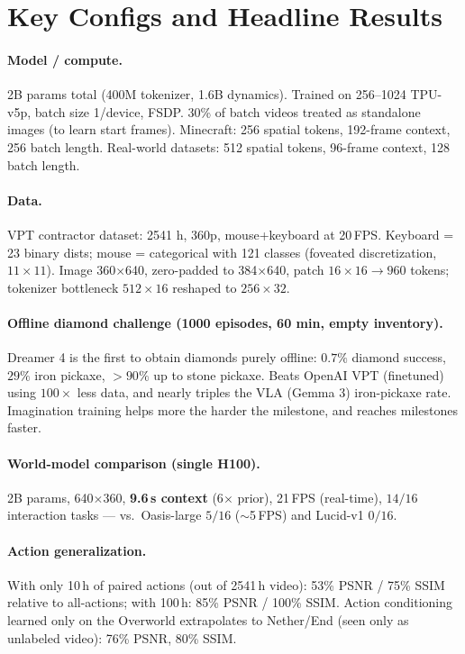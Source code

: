 \documentclass[11pt]{article}
\begin{document}
\section{Key Configs and Headline Results}

\paragraph{Model / compute.}
2B params total (400M tokenizer, 1.6B dynamics). Trained on 256--1024 TPU-v5p, batch
size 1/device, FSDP. 30\% of batch videos treated as standalone images (to learn start
frames). Minecraft: 256 spatial tokens, 192-frame context, 256 batch length. Real-world
datasets: 512 spatial tokens, 96-frame context, 128 batch length.

\paragraph{Data.}
VPT contractor dataset: 2541 h, 360p, mouse+keyboard at 20\,FPS. Keyboard = 23 binary
dists; mouse = categorical with 121 classes (foveated discretization, $11\times11$).
Image 360$\times$640, zero-padded to 384$\times$640, patch $16\times16 \to 960$ tokens;
tokenizer bottleneck $512\times16$ reshaped to $256\times32$.

\paragraph{Offline diamond challenge (1000 episodes, 60 min, empty inventory).}
Dreamer 4 is the first to obtain diamonds purely offline: $0.7\%$ diamond success,
$29\%$ iron pickaxe, $>90\%$ up to stone pickaxe. Beats OpenAI VPT (finetuned) using
$100\times$ less data, and nearly triples the VLA (Gemma 3) iron-pickaxe rate.
Imagination training helps more the harder the milestone, and reaches milestones faster.

\paragraph{World-model comparison (single H100).}
2B params, 640$\times$360, \textbf{9.6\,s context} (6$\times$ prior), 21\,FPS (real-time),
$14/16$ interaction tasks --- vs.\ Oasis-large $5/16$ ($\sim$5\,FPS) and Lucid-v1 $0/16$.

\paragraph{Action generalization.}
With only 10\,h of paired actions (out of 2541\,h video): 53\% PSNR / 75\% SSIM relative
to all-actions; with 100\,h: 85\% PSNR / 100\% SSIM. Action conditioning learned only on
the Overworld extrapolates to Nether/End (seen only as unlabeled video): 76\% PSNR,
80\% SSIM.
\end{document}
